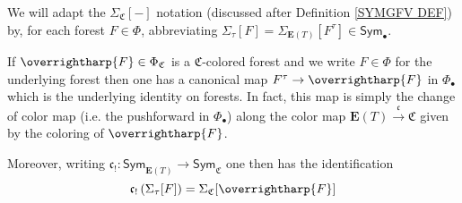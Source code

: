 \documentclass[a4paper,10pt
,draft
]{article}%
\renewcommand{\1}{\eta}%
\newcommand{\vect}[1]{\text{\overrightharp{\ensuremath{#1}}}}
\begin{document}
We will adapt the $\Sigma_{\mathfrak{C}}[-]$ notation
(discussed after Definition \ref{SYMGFV DEF})
by, for each forest $F \in \Phi$, abbreviating
$\Sigma_{\tau}[F] = \Sigma_{\boldsymbol{E}(T)}[F^{\tau}] \in \mathsf{Sym}_{\bullet}$.





\begin{remark}
	If $\vect{F} \in \Phi_{\mathfrak{C}}$ is a $\mathfrak{C}$-colored forest and we write $F \in \Phi$ for the underlying forest
	then one has a canonical map
	$F^{\tau} \to \vect{F}$ in $\Phi_{\bullet}$
	which is the underlying identity on forests. In fact, this map is simply the change of color map (i.e. the pushforward in $\Phi_{\bullet}$) along the color map
	$\boldsymbol{E}(T) \xrightarrow{\mathfrak{c}} \mathfrak{C}$
	given by the coloring of $\vect {F}$.
	
	Moreover, writing 
	$\mathfrak{c}_! \colon 
	\mathsf{Sym}_{\boldsymbol{E}(T)} \to
	\mathsf{Sym}_{\mathfrak{C}}$
	one then has the identification
\begin{equation}\label{CANPUSH EQ}
	\mathfrak{c}_! \left(\Sigma_{\tau}[F]\right) = \Sigma_{\mathfrak{C}}[\vect{F}]
\end{equation}	
	
\end{remark}
\end{document}
